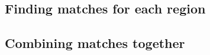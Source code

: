 \documentclass[10pt,a4paper, twocolumn]{article}
\newcommand{\prob}{Pr}
\newcommand{\rgbdimage}{\mathbf{I}}
\newcommand{\imregion}{\mathcal{R}}
\newcommand{\occ}{o}
\newcommand{\basisshape}{B}
\begin{document}
\subsection{Finding matches for each region}


\subsection{Combining matches together}











\end{document}
